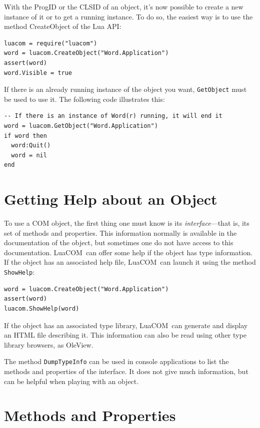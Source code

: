 \documentclass[11pt,a4paper,english]{report}
\newcommand{\ident}[1]{\mbox{\texttt{#1}}}
\newcommand{\techname}[1]{\mbox{#1}}
\newcommand{\luacom}{\techname{LuaCOM}}
\begin{document}
With the ProgID or the CLSID of an object, it's now possible to create
a new instance of it or to get a running instance. To do so, the
easiest way is to use the method CreateObject of the Lua API:

\begin{verbatim}
luacom = require("luacom")
word = luacom.CreateObject("Word.Application")
assert(word)
word.Visible = true
\end{verbatim}

If there is an already running instance of the object you want,
\ident{GetObject} must be used to use it. The following code
illustrates this:

\begin{verbatim}
-- If there is an instance of Word(r) running, it will end it
word = luacom.GetObject("Word.Application")
if word then
  word:Quit()
  word = nil
end
\end{verbatim}

\section{Getting Help about an Object}

To use a COM object, the first thing one must know is its
\emph{interface}---that is, its set of methods and properties. This
information normally is available in the documentation of the object,
but sometimes one do not have access to this documentation. \luacom\
can offer some help if the object has type information. If the object
has an associated help file, \luacom\ can launch it using the method
\ident{ShowHelp}:

\begin{verbatim}
word = luacom.CreateObject("Word.Application")
assert(word)
luacom.ShowHelp(word)
\end{verbatim}

If the object has an associated type library, \luacom\ can generate
and display an HTML file describing it. This information can also be
read using other type library browsers, as OleView.

The method \ident{DumpTypeInfo} can be used in console applications to
list the methods and properties of the interface. It does not give
much information, but can be helpful when playing with an object.


\section{Methods and Properties}
\end{document}
